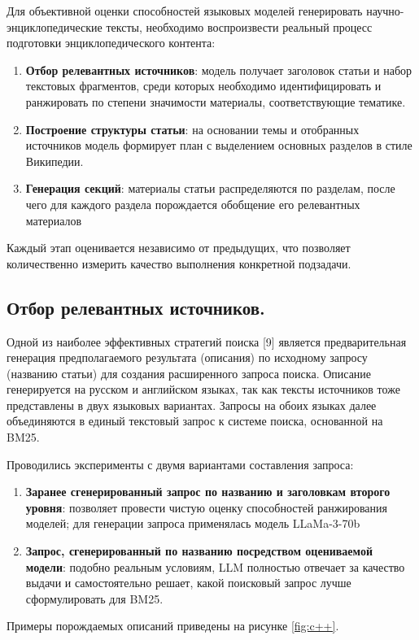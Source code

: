 \documentclass{article}
\begin{document}
Для объективной оценки способностей языковых моделей генерировать научно-энциклопедические тексты, необходимо воспроизвести реальный процесс подготовки энциклопедического контента:
\begin{enumerate}

    \item \textbf{Отбор релевантных источников}: модель получает заголовок статьи и набор текстовых фрагментов, среди которых необходимо идентифицировать и ранжировать по степени значимости материалы, соответствующие тематике. 
    
    \item \textbf{Построение структуры статьи}: на основании темы и отобранных источников модель формирует план с выделением основных разделов в стиле Википедии.
    
    \item \textbf{Генерация секций}: материалы статьи распределяются по разделам, после чего для каждого раздела порождается обобщение его релевантных материалов

\end{enumerate}
Каждый этап оценивается независимо от предыдущих, что позволяет количественно измерить качество выполнения конкретной подзадачи. 
\subsection*{Отбор релевантных источников.}
Одной из наиболее эффективных стратегий поиска [9] является предварительная генерация предполагаемого результата (описания) по исходному запросу (названию статьи) для создания расширенного запроса поиска.
Описание генерируется на русском и английском языках, так как тексты источников тоже представлены в двух языковых вариантах. 
Запросы на обоих языках далее объединяются в единый текстовый запрос к системе поиска, основанной на BM25. 

Проводились эксперименты с двумя вариантами составления запроса:
\begin{enumerate}

    \item \textbf{Заранее сгенерированный запрос по названию и заголовкам второго уровня}: позволяет провести чистую оценку способностей ранжирования моделей; для генерации запроса применялась модель LLaMa-3-70b  
    
    \item \textbf{Запрос, сгенерированный по названию посредством оцениваемой модели}: подобно реальным условиям, LLM полностью отвечает за качество выдачи и самостоятельно решает, какой поисковый запрос лучше сформулировать для BM25.

\end{enumerate}
Примеры порождаемых описаний приведены на рисунке \ref{fig:c++}.
\end{document}

